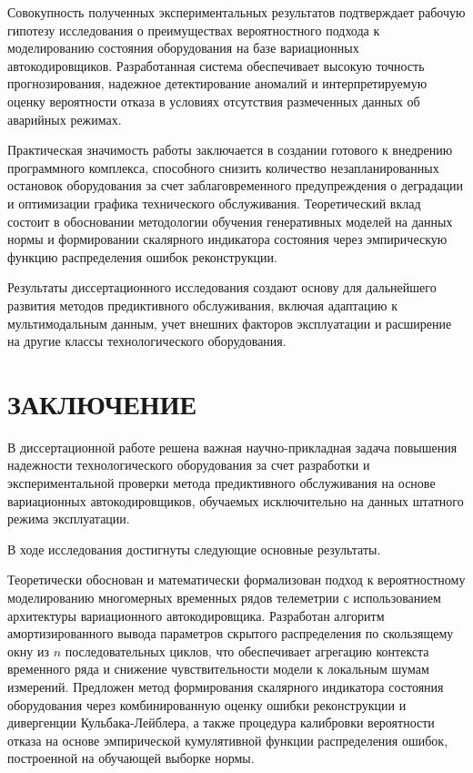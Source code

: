 \documentclass[14pt, a4paper, oneside]{extreport}
\begin{document}
Совокупность полученных экспериментальных результатов подтверждает рабочую гипотезу исследования о преимуществах вероятностного подхода к моделированию состояния оборудования на базе вариационных автокодировщиков. Разработанная система обеспечивает высокую точность прогнозирования, надежное детектирование аномалий и интерпретируемую оценку вероятности отказа в условиях отсутствия размеченных данных об аварийных режимах.

Практическая значимость работы заключается в создании готового к внедрению программного комплекса, способного снизить количество незапланированных остановок оборудования за счет заблаговременного предупреждения о деградации и оптимизации графика технического обслуживания. Теоретический вклад состоит в обосновании методологии обучения генеративных моделей на данных нормы и формировании скалярного индикатора состояния через эмпирическую функцию распределения ошибок реконструкции.

Результаты диссертационного исследования создают основу для дальнейшего развития методов предиктивного обслуживания, включая адаптацию к мультимодальным данным, учет внешних факторов эксплуатации и расширение на другие классы технологического оборудования.

\clearpage

\section{ЗАКЛЮЧЕНИЕ}
\vspace{1em}

В диссертационной работе решена важная научно-прикладная задача повышения надежности технологического оборудования за счет разработки и экспериментальной проверки метода предиктивного обслуживания на основе вариационных автокодировщиков, обучаемых исключительно на данных штатного режима эксплуатации.

В ходе исследования достигнуты следующие основные результаты.

Теоретически обоснован и математически формализован подход к вероятностному моделированию многомерных временных рядов телеметрии с использованием архитектуры вариационного автокодировщика. Разработан алгоритм амортизированного вывода параметров скрытого распределения по скользящему окну из $n$ последовательных циклов, что обеспечивает агрегацию контекста временного ряда и снижение чувствительности модели к локальным шумам измерений. Предложен метод формирования скалярного индикатора состояния оборудования через комбинированную оценку ошибки реконструкции и дивергенции Кульбака-Лейблера, а также процедура калибровки вероятности отказа на основе эмпирической кумулятивной функции распределения ошибок, построенной на обучающей выборке нормы.
\end{document}
